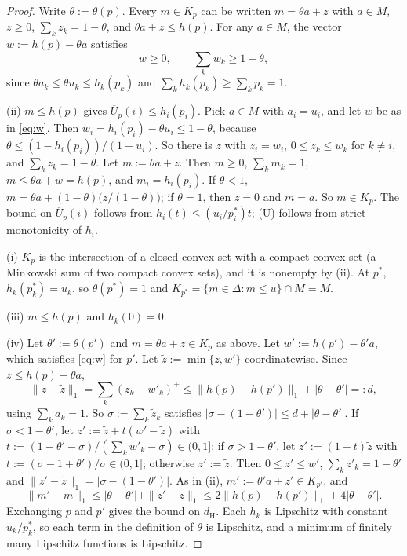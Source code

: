 \documentclass[11pt]{article}
\theoremstyle{definition}
\newcommand{\dH}{d_{\mathrm H}}
\newcommand{\Ub}{\overline U}
\begin{document}
\begin{proof}
Write $\theta:=\theta(p)$. Every $m\in K_p$ can be written $m=\theta a+z$ with $a\in M$, $z\ge0$, $\sum_kz_k=1-\theta$, and $\theta a+z\le h(p)$. For any $a\in M$, the vector $w:=h(p)-\theta a$ satisfies
\begin{equation}\label{eq:w}
w\ge0,\qquad \sum_kw_k\ge1-\theta,
\end{equation}
since $\theta a_k\le\theta u_k\le h_k(p_k)$ and $\sum_kh_k(p_k)\ge\sum_kp_k=1$.

(ii) $m\le h(p)$ gives $\Ub_p(i)\le h_i(p_i)$. Pick $a\in M$ with $a_i=u_i$, and let $w$ be as in \eqref{eq:w}. Then $w_i=h_i(p_i)-\theta u_i\le1-\theta$, because $\theta\le(1-h_i(p_i))/(1-u_i)$. So there is $z$ with $z_i=w_i$, $0\le z_k\le w_k$ for $k\ne i$, and $\sum_kz_k=1-\theta$. Let $m:=\theta a+z$. Then $m\ge0$, $\sum_km_k=1$, $m\le\theta a+w=h(p)$, and $m_i=h_i(p_i)$. If $\theta<1$, $m=\theta a+(1-\theta)\big(z/(1-\theta)\big)$; if $\theta=1$, then $z=0$ and $m=a$. So $m\in K_p$. The bound on $\Ub_p(i)$ follows from $h_i(t)\le(u_i/p^*_i)t$; (U) follows from strict monotonicity of $h_i$.

(i) $K_p$ is the intersection of a closed convex set with a compact convex set (a Minkowski sum of two compact convex sets), and it is nonempty by (ii). At $p^*$, $h_k(p^*_k)=u_k$, so $\theta(p^*)=1$ and $K_{p^*}=\{m\in\Delta:m\le u\}\cap M=M$.

(iii) $m\le h(p)$ and $h_k(0)=0$.

(iv) Let $\theta':=\theta(p')$ and $m=\theta a+z\in K_p$ as above. Let $w':=h(p')-\theta'a$, which satisfies \eqref{eq:w} for $p'$. Let $\tilde z:=\min\{z,w'\}$ coordinatewise. Since $z\le h(p)-\theta a$,
\[
\|z-\tilde z\|_1=\sum_k(z_k-w'_k)^+\le\|h(p)-h(p')\|_1+|\theta-\theta'|=:d,
\]
using $\sum_ka_k=1$. So $\sigma:=\sum_k\tilde z_k$ satisfies $|\sigma-(1-\theta')|\le d+|\theta-\theta'|$. If $\sigma<1-\theta'$, let $z':=\tilde z+t(w'-\tilde z)$ with $t:=(1-\theta'-\sigma)/(\sum_kw'_k-\sigma)\in(0,1]$; if $\sigma>1-\theta'$, let $z':=(1-t)\tilde z$ with $t:=(\sigma-1+\theta')/\sigma\in(0,1]$; otherwise $z':=\tilde z$. Then $0\le z'\le w'$, $\sum_kz'_k=1-\theta'$ and $\|z'-\tilde z\|_1=|\sigma-(1-\theta')|$. As in (ii), $m':=\theta'a+z'\in K_{p'}$, and
\[
\|m'-m\|_1\le|\theta-\theta'|+\|z'-z\|_1\le2\|h(p)-h(p')\|_1+4|\theta-\theta'|.
\]
Exchanging $p$ and $p'$ gives the bound on $\dH$. Each $h_k$ is Lipschitz with constant $u_k/p^*_k$, so each term in the definition of $\theta$ is Lipschitz, and a minimum of finitely many Lipschitz functions is Lipschitz.
\end{proof}
\end{document}
